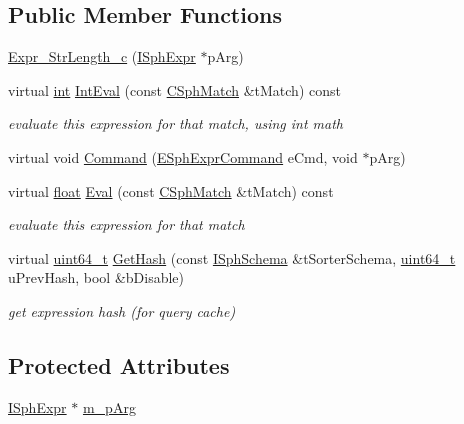 \subsection*{Public Member Functions}
\begin{DoxyCompactItemize}
\item 
\hyperlink{classExpr__StrLength__c_a3424400d4e50caeda2e083385f490524}{Expr\-\_\-\-Str\-Length\-\_\-c} (\hyperlink{structISphExpr}{I\-Sph\-Expr} $\ast$p\-Arg)
\item 
virtual \hyperlink{sphinxexpr_8cpp_a4a26e8f9cb8b736e0c4cbf4d16de985e}{int} \hyperlink{classExpr__StrLength__c_ac2139bdcdaeba92fc8eb91ef63ad9716}{Int\-Eval} (const \hyperlink{classCSphMatch}{C\-Sph\-Match} \&t\-Match) const 
\begin{DoxyCompactList}\small\item\em evaluate this expression for that match, using int math \end{DoxyCompactList}\item 
virtual void \hyperlink{classExpr__StrLength__c_a9ef46799e56477b1a1896ef0c2378ec5}{Command} (\hyperlink{sphinxexpr_8h_a30be184fb07bd80c271360fc6094c818}{E\-Sph\-Expr\-Command} e\-Cmd, void $\ast$p\-Arg)
\item 
virtual \hyperlink{sphinxexpr_8cpp_a0e0d0739f7035f18f949c2db2c6759ec}{float} \hyperlink{classExpr__StrLength__c_a85e39be4bb3c3a035909055f43a13d12}{Eval} (const \hyperlink{classCSphMatch}{C\-Sph\-Match} \&t\-Match) const 
\begin{DoxyCompactList}\small\item\em evaluate this expression for that match \end{DoxyCompactList}\item 
virtual \hyperlink{sphinxstd_8h_aaa5d1cd013383c889537491c3cfd9aad}{uint64\-\_\-t} \hyperlink{classExpr__StrLength__c_aefdebc4a50b3e51a9cb4293794629cb7}{Get\-Hash} (const \hyperlink{classISphSchema}{I\-Sph\-Schema} \&t\-Sorter\-Schema, \hyperlink{sphinxstd_8h_aaa5d1cd013383c889537491c3cfd9aad}{uint64\-\_\-t} u\-Prev\-Hash, bool \&b\-Disable)
\begin{DoxyCompactList}\small\item\em get expression hash (for query cache) \end{DoxyCompactList}\end{DoxyCompactItemize}
\subsection*{Protected Attributes}
\begin{DoxyCompactItemize}
\item 
\hyperlink{structISphExpr}{I\-Sph\-Expr} $\ast$ \hyperlink{classExpr__StrLength__c_a9e6463167bbf548353d7c2205558ae96}{m\-\_\-p\-Arg}
\end{DoxyCompactItemize}
